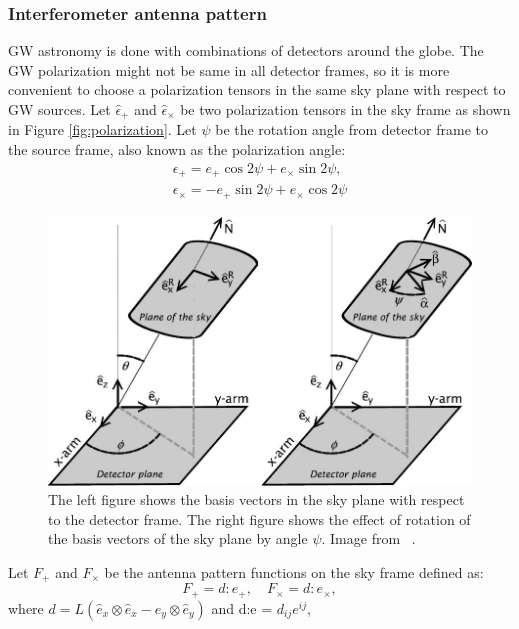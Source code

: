 \documentclass{ttuthes2007}
\begin{document}
\subsubsection{Interferometer antenna pattern}
\ac{GW} astronomy is done with combinations of detectors around the globe. The
\ac{GW} polarization might not be same in all detector frames, so it is more
convenient to choose a polarization tensors in the same sky plane with respect
to \ac{GW} sources. Let $\hat\epsilon_+$ and $\hat\epsilon_\times$ be two
polarization tensors in the sky frame as shown in Figure \ref{fig:polarization}. Let
$\psi$ be the rotation angle from detector frame to the source frame, also known
as the polarization angle:
\begin{equation}
\begin{aligned}
\epsilon_+ = e_+\cos{2\psi} + e_\times \sin{2\psi}, \\
\epsilon_\times = -e_+\sin{2\psi} + e_\times \cos2{\psi}
\end{aligned}
\end{equation}
\begin{figure}[h!]
	\includegraphics[width=\textwidth]{figure/antennae.jpg}
	\caption{The left figure shows the basis vectors in the sky plane with
respect to the detector frame. The right figure shows the effect of rotation of
the basis vectors of the sky plane by angle $\psi$. Image from
~\cite{Sathyaprakash_2009}.}
\end{figure}  

Let $F_+$ and $F_\times$ be the antenna pattern functions on the sky frame
defined as:
\begin{equation}
F_+=d:e_+, \quad  F_\times=d:e_\times,
\end{equation}
where $d=L(\hat{e}_x\otimes\hat{e}_x- \hat{e}_y\otimes\hat{e}_y)$ and d:e =
$d_{ij}e^{ij}$,\\ 
\end{document}
